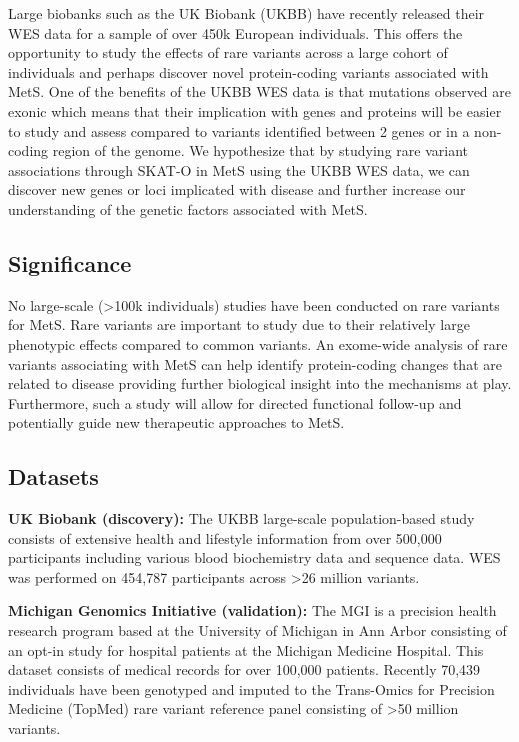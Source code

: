 \documentclass[11pt]{article}
\begin{document}
Large biobanks such as the UK Biobank (UKBB) have recently released their WES data for a sample of over 450k European individuals. This offers the opportunity to study the effects of rare variants across a large cohort of individuals and perhaps discover novel protein-coding variants associated with MetS. One of the benefits of the UKBB WES data is that mutations observed are exonic which means that their implication with genes and proteins will be easier to study and assess compared to variants identified between 2 genes or in a non-coding region of the genome. We hypothesize that by studying rare variant associations through SKAT-O in MetS using the UKBB WES data, we can discover new genes or loci implicated with disease and further increase our understanding of the genetic factors associated with MetS.

\subsection*{Significance}

No large-scale (>100k individuals) studies have been conducted on rare variants for MetS. Rare variants are important to study due to their relatively large phenotypic effects compared to common variants. An exome-wide analysis of rare variants associating with MetS can help identify protein-coding changes that are related to disease providing further biological insight into the mechanisms at play. Furthermore, such a study will allow for directed functional follow-up and potentially guide new therapeutic approaches to MetS.

\subsection*{Datasets}

\textbf{UK Biobank (discovery):} The UKBB large-scale population-based study consists of extensive health and lifestyle information from over 500,000 participants including various blood biochemistry data and sequence data. WES was performed on 454,787 participants across >26 million variants.

\textbf{Michigan Genomics Initiative (validation):} The MGI is a precision health research program based at the University of Michigan in Ann Arbor consisting of an opt-in study for hospital patients at the Michigan Medicine Hospital. This dataset consists of medical records for over 100,000 patients. Recently 70,439 individuals have been genotyped and imputed to the Trans-Omics for Precision Medicine (TopMed) rare variant reference panel consisting of >50 million variants.
\end{document}
